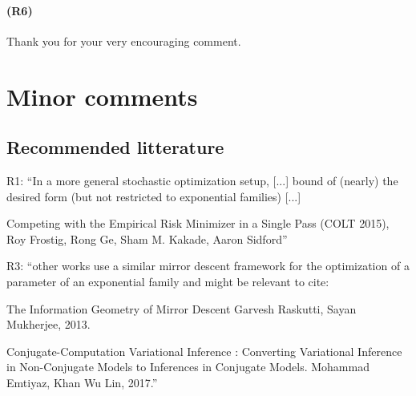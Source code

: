 \paragraph{(R6)} 
Thank you for your very encouraging comment.




\section*{Minor comments}

\subsection*{Recommended litterature}

R1:
``In a more general stochastic optimization setup, [...]  bound of (nearly) the desired form (but not restricted to exponential families) [...] 

Competing with the Empirical Risk Minimizer in a Single Pass (COLT 2015), Roy Frostig, Rong Ge, Sham M. Kakade, Aaron Sidford''

R3:
``other works use a similar mirror descent framework for the optimization of a parameter of an exponential family and might be relevant to cite:

The Information Geometry of Mirror Descent
Garvesh Raskutti, Sayan Mukherjee, 2013.

Conjugate-Computation Variational Inference : Converting Variational Inference in Non-Conjugate Models to Inferences in Conjugate Models. Mohammad Emtiyaz, Khan Wu Lin, 2017.'' 

